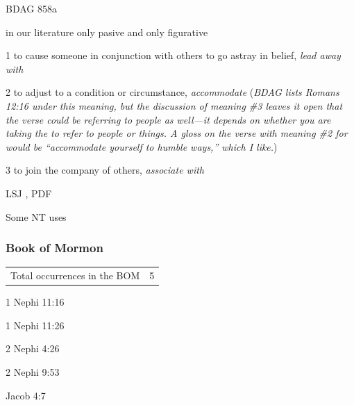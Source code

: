 				\begin{compactdesc}
					\item[BDAG 858a] \textbf{}
						\begin{compactitem}
							\item in our literature only pasive and only figurative
							\item[1] to cause someone in conjunction with others to go astray in belief, \textit{lead away with}
							\item[2] to adjust to a condition or circumstance, \textit{accommodate} (\textit{BDAG lists Romans 12:16 under this meaning, but the discussion of meaning \#3 leaves it open that the verse could be referring to people as well---it depends on whether you are taking the  to refer to people or things. A gloss on the verse with meaning \#2 for  would be ``accommodate yourself to humble ways,'' which I like.})
							\item[3] to join the company of others, \textit{associate with} 
						\end{compactitem}
					\item[LSJ , PDF ] \textbf{}
						\begin{compactitem}
							\item 
						\end{compactitem}
				\end{compactdesc}
				
				\begin{compactdesc}
					\item[Some NT uses] \textbf{}
						\begin{compactdesc}
							\item[]
						\end{compactdesc}
				\end{compactdesc}
		
	\subsubsection{Book of Mormon} %
		\label{CONDESCENSION-BOM}
	
		\begin{tabular}{ll}
			Total occurrences in the BOM & 5
		\end{tabular}
		
		\begin{compactdesc}
			\item[1 Nephi 11:16]
			\item[1 Nephi 11:26]
			\item[2 Nephi 4:26]
			\item[2 Nephi 9:53] 
			\item[Jacob 4:7]
		\end{compactdesc}
		
